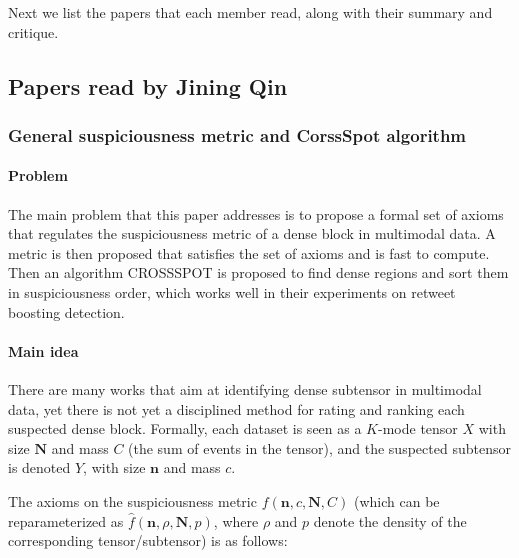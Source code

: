 
Next we list the papers that each member read, along with their summary and critique.

\subsection{Papers read by Jining Qin}

\subsubsection{General suspiciousness metric and CorssSpot algorithm \cite{jiang2015general} }

\paragraph{Problem} The main problem that this paper addresses is to propose a formal set of axioms that regulates the suspiciousness metric of a dense block in multimodal data. A metric is then proposed that satisfies the set of axioms and is fast to compute. Then an algorithm CROSSSPOT is proposed to find dense regions and sort them in suspiciousness order, which works well in their experiments on retweet boosting detection.

\paragraph{Main idea} 
There are many works that aim at identifying dense subtensor in multimodal data, yet there is not yet a disciplined method for rating and ranking each suspected dense block. Formally, each dataset is seen as a $K$-mode tensor $X$ with size $\mathbf{N}$ and mass $C$ (the sum of events in the tensor), and the suspected subtensor is denoted $Y$, with size $\mathbf{n}$ and mass $c$.

The axioms on the suspiciousness metric $f(\mathbf{n}, c, \mathbf{N}, C)$ (which can be reparameterized as $\hat{f}(\mathbf{n}, \rho, \mathbf{N}, p)$, where $\rho$ and $p$ denote the density of the corresponding tensor/subtensor) is as follows:

